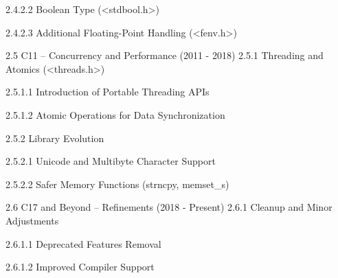 2.4.2.2 Boolean Type (<stdbool.h>)

2.4.2.3 Additional Floating-Point Handling (<fenv.h>)

2.5 C11 – Concurrency and Performance (2011 - 2018)
2.5.1 Threading and Atomics (<threads.h>)

2.5.1.1 Introduction of Portable Threading APIs

2.5.1.2 Atomic Operations for Data Synchronization

2.5.2 Library Evolution

2.5.2.1 Unicode and Multibyte Character Support

2.5.2.2 Safer Memory Functions (strncpy, memset_s)

2.6 C17 and Beyond – Refinements (2018 - Present)
2.6.1 Cleanup and Minor Adjustments

2.6.1.1 Deprecated Features Removal

2.6.1.2 Improved Compiler Support

